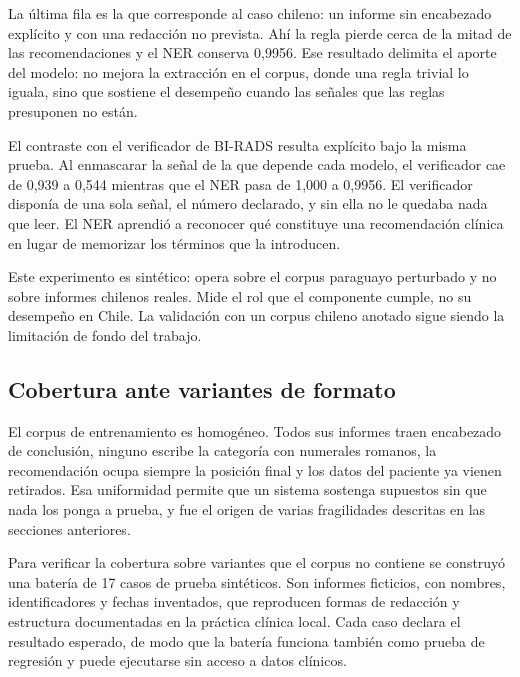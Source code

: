 \documentclass[10pt,journal,a4paper]{IEEEtran}
\begin{document}
La \'ultima fila es la que corresponde al caso chileno: un informe sin encabezado expl\'icito y con una redacci\'on no prevista. Ah\'i la regla pierde cerca de la mitad de las recomendaciones y el NER conserva 0,9956. Ese resultado delimita el aporte del modelo: no mejora la extracci\'on en el corpus, donde una regla trivial lo iguala, sino que sostiene el desempe\~no cuando las se\~nales que las reglas presuponen no est\'an.

El contraste con el verificador de BI-RADS resulta expl\'icito bajo la misma prueba. Al enmascarar la se\~nal de la que depende cada modelo, el verificador cae de 0,939 a 0,544 mientras que el NER pasa de 1,000 a 0,9956. El verificador dispon\'ia de una sola se\~nal, el n\'umero declarado, y sin ella no le quedaba nada que leer. El NER aprendi\'o a reconocer qu\'e constituye una recomendaci\'on cl\'inica en lugar de memorizar los t\'erminos que la introducen.

Este experimento es sint\'etico: opera sobre el corpus paraguayo perturbado y no sobre informes chilenos reales. Mide el rol que el componente cumple, no su desempe\~no en Chile. La validaci\'on con un corpus chileno anotado sigue siendo la limitaci\'on de fondo del trabajo.

\subsection{Cobertura ante variantes de formato}\label{sec:robustez}
El corpus de entrenamiento es homog\'eneo. Todos sus informes traen encabezado de conclusi\'on, ninguno escribe la categor\'ia con numerales romanos, la recomendaci\'on ocupa siempre la posici\'on final y los datos del paciente ya vienen retirados. Esa uniformidad permite que un sistema sostenga supuestos sin que nada los ponga a prueba, y fue el origen de varias fragilidades descritas en las secciones anteriores.

Para verificar la cobertura sobre variantes que el corpus no contiene se construy\'o una bater\'ia de 17 casos de prueba sint\'eticos. Son informes ficticios, con nombres, identificadores y fechas inventados, que reproducen formas de redacci\'on y estructura documentadas en la pr\'actica cl\'inica local. Cada caso declara el resultado esperado, de modo que la bater\'ia funciona tambi\'en como prueba de regresi\'on y puede ejecutarse sin acceso a datos cl\'inicos.
\end{document}
